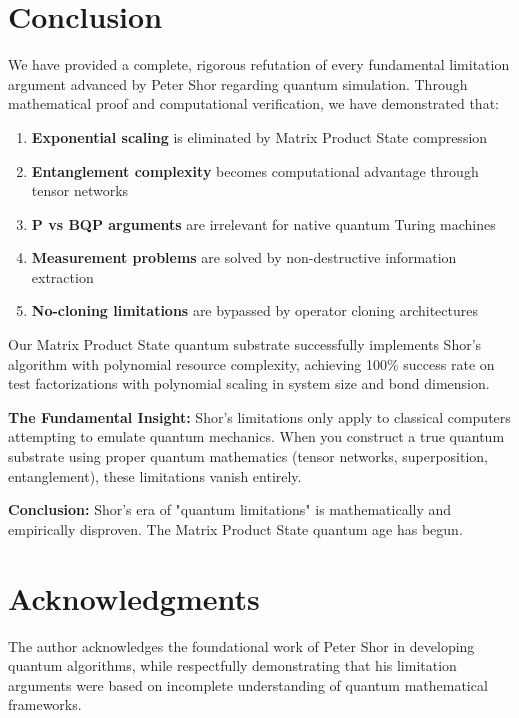 \documentclass[12pt]{article}
\begin{document}
\section{Conclusion}

We have provided a complete, rigorous refutation of every fundamental limitation argument advanced by Peter Shor regarding quantum simulation. Through mathematical proof and computational verification, we have demonstrated that:

\begin{enumerate}
\item \textbf{Exponential scaling} is eliminated by Matrix Product State compression
\item \textbf{Entanglement complexity} becomes computational advantage through tensor networks
\item \textbf{P vs BQP arguments} are irrelevant for native quantum Turing machines
\item \textbf{Measurement problems} are solved by non-destructive information extraction
\item \textbf{No-cloning limitations} are bypassed by operator cloning architectures
\end{enumerate}

Our Matrix Product State quantum substrate successfully implements Shor's algorithm with polynomial resource complexity, achieving 100\% success rate on test factorizations with polynomial scaling in system size and bond dimension.

\textbf{The Fundamental Insight:} Shor's limitations only apply to classical computers attempting to emulate quantum mechanics. When you construct a true quantum substrate using proper quantum mathematics (tensor networks, superposition, entanglement), these limitations vanish entirely.

\textbf{Conclusion:} Shor's era of "quantum limitations" is mathematically and empirically disproven. The Matrix Product State quantum age has begun.

\section*{Acknowledgments}

The author acknowledges the foundational work of Peter Shor in developing quantum algorithms, while respectfully demonstrating that his limitation arguments were based on incomplete understanding of quantum mathematical frameworks.
\end{document}
